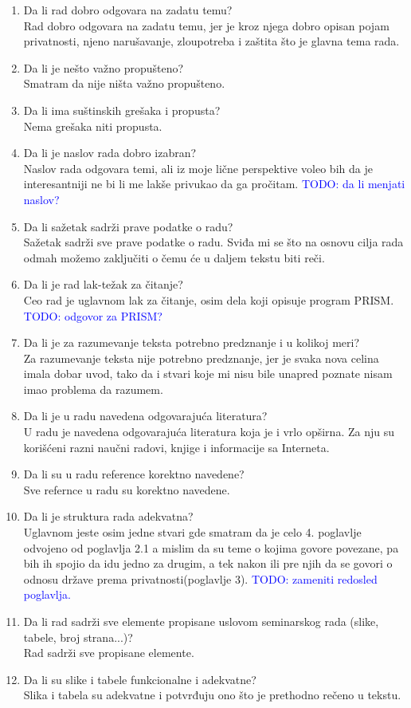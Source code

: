 \documentclass[a4paper]{report}
\newcommand{\odgovor}[1]{\textcolor{blue}{#1}}
\begin{document}
\begin{enumerate}
\item Da li rad dobro odgovara na zadatu temu?\\
Rad dobro odgovara na zadatu temu, jer je kroz njega dobro opisan pojam privatnosti, njeno narušavanje, zloupotreba i zaštita što je glavna tema rada.   
\item Da li je nešto važno propušteno?\\
Smatram da nije ništa važno propušteno.
\item Da li ima suštinskih grešaka i propusta?\\
Nema grešaka niti propusta.
\item Da li je naslov rada dobro izabran?\\
Naslov rada odgovara temi, ali iz moje lične perspektive voleo bih da je interesantniji ne bi li me lakše privukao da ga pročitam.
\odgovor{TODO: da li menjati naslov?}
\item Da li sažetak sadrži prave podatke o radu?\\
Sažetak sadrži sve prave podatke o radu. Sviđa mi se što na osnovu cilja rada odmah možemo zaključiti o čemu će u daljem tekstu biti reči. 
\item Da li je rad lak-težak za čitanje?\\
Ceo rad je uglavnom lak za čitanje, osim dela koji opisuje program PRISM.
\odgovor{TODO: odgovor za PRISM?} 
\item Da li je za razumevanje teksta potrebno predznanje i u kolikoj meri?\\
Za razumevanje teksta nije potrebno predznanje, jer je svaka nova celina imala dobar uvod, tako da i stvari koje mi nisu bile unapred poznate nisam imao problema da razumem.
\item Da li je u radu navedena odgovarajuća literatura?\\
U radu je navedena odgovarajuća literatura koja je i vrlo opširna. Za nju su korišćeni razni naučni radovi, knjige i informacije sa Interneta. 
\item Da li su u radu reference korektno navedene?\\
Sve refernce u radu su korektno navedene.
\item Da li je struktura rada adekvatna?\\
Uglavnom jeste osim jedne stvari gde smatram da je celo 4. poglavlje odvojeno od poglavlja 2.1 a mislim da su teme o kojima govore povezane, pa bih ih spojio da idu jedno za drugim, a tek nakon ili pre njih da se govori o odnosu države prema privatnosti(poglavlje 3).
\odgovor{TODO: zameniti redosled poglavlja.}
\item Da li rad sadrži sve elemente propisane uslovom seminarskog rada (slike, tabele, broj strana...)?\\
Rad sadrži sve propisane elemente.
\item Da li su slike i tabele funkcionalne i adekvatne?\\
Slika i tabela su adekvatne i potvrđuju ono što je prethodno rečeno u tekstu.
\end{enumerate}
\end{document}
